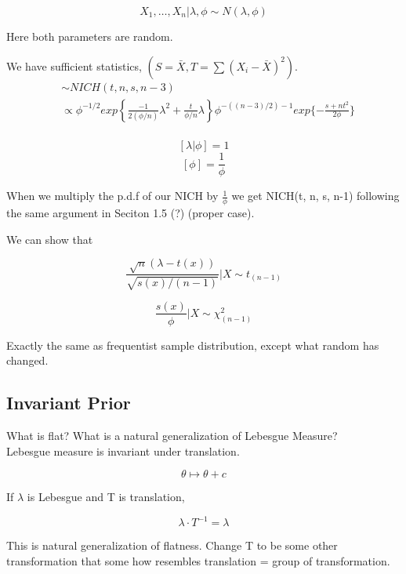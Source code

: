 \documentclass[11pt,fleqn]{book} %
\begin{document}
\begin{example}
	$$X_1, \dots, X_n|\lambda, \phi \sim N(\lambda, \phi) $$

	Here both parameters are random. 

	We have sufficient statistics, $(S = \bar{X}, T= \sum(X_i - \bar{X})^2)$. \\

	\begin{align*}
		[(\lambda, \phi) \mapsto f(t, s| \lambda, \phi)] &\sim NICH(t, n, s, n-3)\\
			&\propto \phi^{-1/2} exp\left\{\frac{-1}{2(\phi/n)}\lambda^2 + \frac{t}{\phi/n}\lambda\right\} \phi^{-((n-3)/2) - 1} exp\{-\frac{s+ nt^2}{2\phi}\}
	\end{align*}\\

	$$[\lambda|\phi] = 1 $$
	$$[\phi] = \frac{1}{\phi} $$

	When we multiply the p.d.f of our NICH by $\frac{1}{\phi}$ we get NICH(t, n, s, n-1) following the same argument in Seciton 1.5 (?) (proper case).


	We can show that 

			$$\frac{\sqrt{n}(\lambda - t(x))}{\sqrt{s(x)/(n-1)}}|X \sim t_{(n-1)} $$

			$$\frac{s(x)}{\phi}|X \sim \chi^2_{(n-1)} $$

	Exactly the same as frequentist sample distribution, except what random has changed. 

\end{example}

\subsection{Invariant Prior} %
\label{sub:invariant_prior}

What is flat? What is a natural generalization of Lebesgue Measure? \\

Lebesgue measure is invariant under translation. 

		$$\theta \mapsto \theta + c $$

If $\lambda$ is Lebesgue and T is translation, 

		$$\lambda \cdot T^{-1} = \lambda $$

This is natural generalization of flatness. Change T to be some other transformation that some how resembles translation = group of transformation. \\
\end{document}
